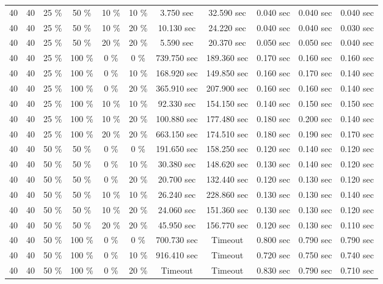 \documentclass{article}
\begin{document}
\begin{longtable}[]{@{}ccccccccccc@{}}
40 & 40 & 25 \% & 50 \% & 10 \% & 10 \% & 3.750 sec & 32.590 sec & 0.040 sec & 0.040 sec & 0.040 sec \\
40 & 40 & 25 \% & 50 \% & 10 \% & 20 \% & 10.130 sec & 24.220 sec & 0.040 sec & 0.040 sec & 0.030 sec \\
40 & 40 & 25 \% & 50 \% & 20 \% & 20 \% & 5.590 sec & 20.370 sec & 0.050 sec & 0.050 sec & 0.040 sec \\
40 & 40 & 25 \% & 100 \% & 0 \% & 0 \% & 739.750 sec & 189.360 sec & 0.170 sec & 0.160 sec & 0.160 sec \\
40 & 40 & 25 \% & 100 \% & 0 \% & 10 \% & 168.920 sec & 149.850 sec & 0.160 sec & 0.170 sec & 0.140 sec \\
40 & 40 & 25 \% & 100 \% & 0 \% & 20 \% & 365.910 sec & 207.900 sec & 0.160 sec & 0.160 sec & 0.140 sec \\
40 & 40 & 25 \% & 100 \% & 10 \% & 10 \% & 92.330 sec & 154.150 sec & 0.140 sec & 0.150 sec & 0.150 sec \\
40 & 40 & 25 \% & 100 \% & 10 \% & 20 \% & 100.880 sec & 177.480 sec & 0.180 sec & 0.200 sec & 0.140 sec \\
40 & 40 & 25 \% & 100 \% & 20 \% & 20 \% & 663.150 sec & 174.510 sec & 0.180 sec & 0.190 sec & 0.170 sec \\
40 & 40 & 50 \% & 50 \% & 0 \% & 0 \% & 191.650 sec & 158.250 sec & 0.120 sec & 0.140 sec & 0.120 sec \\
40 & 40 & 50 \% & 50 \% & 0 \% & 10 \% & 30.380 sec & 148.620 sec & 0.130 sec & 0.140 sec & 0.120 sec \\
40 & 40 & 50 \% & 50 \% & 0 \% & 20 \% & 20.700 sec & 132.440 sec & 0.120 sec & 0.130 sec & 0.120 sec \\
40 & 40 & 50 \% & 50 \% & 10 \% & 10 \% & 26.240 sec & 228.860 sec & 0.130 sec & 0.130 sec & 0.140 sec \\
40 & 40 & 50 \% & 50 \% & 10 \% & 20 \% & 24.060 sec & 151.360 sec & 0.130 sec & 0.130 sec & 0.120 sec \\
40 & 40 & 50 \% & 50 \% & 20 \% & 20 \% & 45.950 sec & 156.770 sec & 0.120 sec & 0.130 sec & 0.110 sec \\
40 & 40 & 50 \% & 100 \% & 0 \% & 0 \% & 700.730 sec & Timeout & 0.800 sec & 0.790 sec & 0.790 sec \\
40 & 40 & 50 \% & 100 \% & 0 \% & 10 \% & 916.410 sec & Timeout & 0.720 sec & 0.750 sec & 0.740 sec \\
40 & 40 & 50 \% & 100 \% & 0 \% & 20 \% & Timeout & Timeout & 0.830 sec & 0.790 sec & 0.710 sec \\

\end{longtable}
\end{document}

